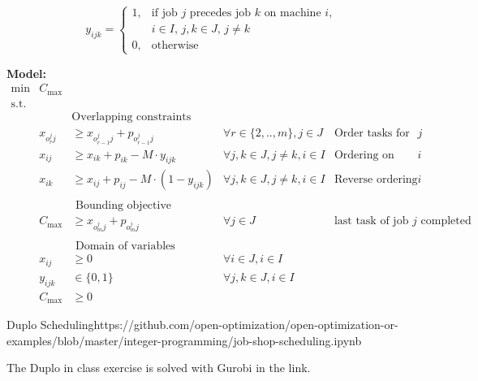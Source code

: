 {$$
y_{ijk} = \begin{cases} 1, & \text{if job } j \text{ precedes job } k \text{ on machine } i \text{,}\\ & i \in I \text{, } j, k  \in J \text{, } j \neq k \\ 0, & \text{otherwise} \end{cases}
$$


\noindent \textbf{Model:}
\begin{subequations}
\begin{equation}
\begin{array}{rrlrr}
\min 
               & C_{\max} \\
\text{s.t.} \\
&& \text{Overlapping constraints}\\
&            x_{o^{j}_{r}j} &  \geq x_{o^{j}_{r-1}j} +p_{o^{j}_{r-1}j} & \forall r \in \{2,..,m\}, j \in {J} & \text{Order tasks for job $j$} \\
             &      x_{ij}     & \geq x_{ik} + p_{ik} - M \cdot y_{ijk} & \forall j,k \in {J}, j \neq k, i \in {I} & \text{Ordering on machine $i$} \\
              &     x_{ik}     & \geq x_{ij} + p_{ij} - M \cdot (1-y_{ijk}) & \forall j,k \in {J}, j \neq k,i \in {I} & \text{Reverse ordering on machine $i$}\\
              \\
           &   & \text{ Bounding objective}\\
            &       C_{\max}          & \geq x_{o^{j}_{m}j} + p_{o^{j}_{m}j} & \forall j \in {J} & \text{last task of job $j$ completed before end}\\
            \\
            && \text{ Domain of variables}\\
            &      x_{ij}      & \geq 0 & \forall i \in {J}, i \in {I} \\
           &       y_{ijk}     & \in \{0,1\} & \forall j,k \in {J}, i \in {I} \\
          &        C_{\max} & \geq 0
              \end{array}
              \end{equation}
\end{subequations}
\begin{examplewithallcode}{Duplo Scheduling}{}{}{https://github.com/open-optimization/open-optimization-or-examples/blob/master/integer-programming/job-shop-scheduling.ipynb}

The Duplo in class exercise is solved with Gurobi in the link.


\end{examplewithallcode}}
